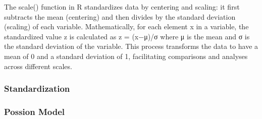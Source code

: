 \documentclass[
]{article}
\newenvironment{Shaded}{\begin{snugshade}}{\end{snugshade}}
\newcommand{\AttributeTok}[1]{\textcolor[rgb]{0.13,0.29,0.53}{#1}}
\newcommand{\CommentTok}[1]{\textcolor[rgb]{0.56,0.35,0.01}{\textit{#1}}}
\newcommand{\ConstantTok}[1]{\textcolor[rgb]{0.56,0.35,0.01}{#1}}
\newcommand{\FunctionTok}[1]{\textcolor[rgb]{0.13,0.29,0.53}{\textbf{#1}}}
\newcommand{\NormalTok}[1]{#1}
\newcommand{\OtherTok}[1]{\textcolor[rgb]{0.56,0.35,0.01}{#1}}
\newcommand{\SpecialCharTok}[1]{\textcolor[rgb]{0.81,0.36,0.00}{\textbf{#1}}}
\begin{document}
The scale() function in R standardizes data by centering and scaling: it
first subtracts the mean (centering) and then divides by the standard
deviation (scaling) of each variable. Mathematically, for each element x
in a variable, the standardized value z is calculated as z = (x−μ)/σ
where μ is the mean and σ is the standard deviation of the variable.
This process transforms the data to have a mean of 0 and a standard
deviation of 1, facilitating comparisons and analyses across different
scales.

\hypertarget{standardization}{%
\subsubsection{Standardization}\label{standardization}}

\begin{Shaded}
\end{Shaded}

\hypertarget{possion-model}{%
\subsubsection{Possion Model}\label{possion-model}}
\end{document}
